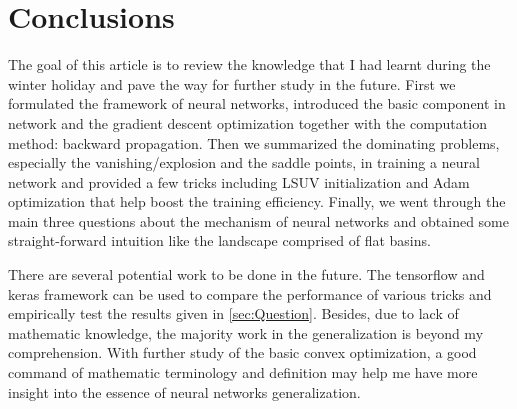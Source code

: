 \section{Conclusions}
The goal of this article is to review the knowledge that I 
had learnt during the winter holiday and pave the way for 
further study in the future. First we formulated the framework
of neural networks, introduced the basic component in network 
and the gradient descent optimization together with the computation
method: backward propagation. Then we summarized the dominating
problems, especially the vanishing/explosion and the saddle points,
in training a neural network and provided a few tricks
including LSUV initialization and Adam optimization that
help boost the training efficiency. Finally, we went through
the main three questions about the mechanism of neural networks
and obtained some straight-forward intuition like the landscape
comprised of flat basins. 
\par There are several potential work to be done in the 
future. The tensorflow and keras framework can be used to 
compare the performance of various tricks and empirically 
test the results given in \autoref{sec:Question}. Besides,
due to lack of mathematic knowledge, the majority work in 
the generalization is beyond my comprehension. With further 
study of the basic convex optimization, a good command of 
mathematic terminology and definition may help me have more
insight into the essence of neural networks generalization.
